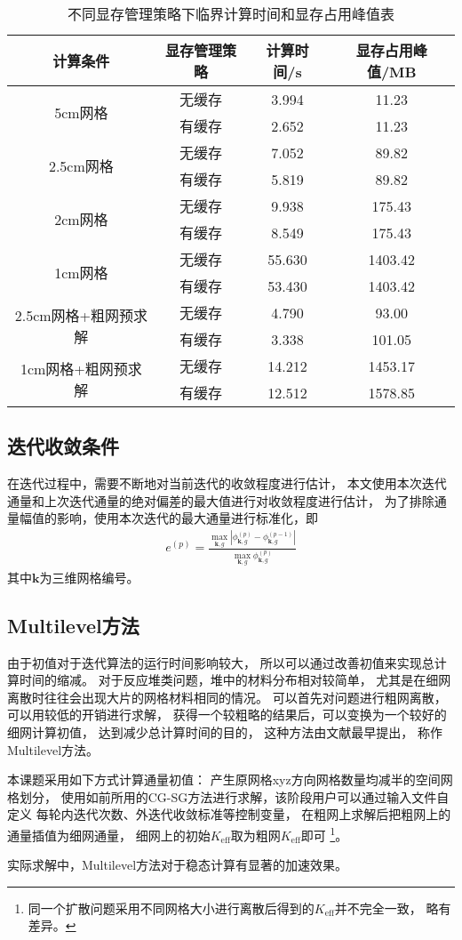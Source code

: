 \begin{table}
\centering
\caption{不同显存管理策略下临界计算时间和显存占用峰值表}
\label{tab:program.cached_alloc}
\begin{tabular}{cccc}
\toprule
计算条件 & 显存管理策略 & 计算时间/s & 显存占用峰值/MB\\
\midrule
\multirow{2}{*}{5cm网格}
 & 无缓存 & 3.994 & 11.23\\
 & 有缓存 & 2.652 & 11.23\\
\multirow{2}{*}{2.5cm网格}
 & 无缓存 & 7.052 & 89.82\\
 & 有缓存 & 5.819 & 89.82\\
\multirow{2}{*}{2cm网格}
 & 无缓存 & 9.938 & 175.43\\
 & 有缓存 & 8.549 & 175.43\\
\multirow{2}{*}{1cm网格}
 & 无缓存 & 55.630 & 1403.42\\
 & 有缓存 & 53.430 & 1403.42\\

\multirow{2}{*}{2.5cm网格+粗网预求解}
 & 无缓存 & 4.790 & 93.00\\
 & 有缓存 & 3.338 & 101.05\\
\multirow{2}{*}{1cm网格+粗网预求解}
 & 无缓存 & 14.212 & 1453.17\\
 & 有缓存 & 12.512 & 1578.85\\
\bottomrule
\end{tabular}
\end{table}

\subsection{迭代收敛条件}

在迭代过程中，需要不断地对当前迭代的收敛程度进行估计，
本文使用本次迭代通量和上次迭代通量的绝对偏差的最大值进行对收敛程度进行估计，
为了排除通量幅值的影响，使用本次迭代的最大通量进行标准化，即
\begin{align}
e^{(p)}=\frac{\displaystyle \max_{\bm{k},g}\left|\phi_{\bm{k},g}^{(p)}-\phi_{\bm{k},g}^{(p-1)}\right|}
         {\displaystyle \max_{\bm{k},g}\phi_{\bm{k},g}^{(p)}}
\end{align}
其中$\bm{k}$为三维网格编号。


\subsection{Multilevel方法}
\label{sec:equsolve.multimesh}

由于初值对于迭代算法的运行时间影响较大，
所以可以通过改善初值来实现总计算时间的缩减。
对于反应堆类问题，堆中的材料分布相对较简单，
尤其是在细网离散时往往会出现大片的网格材料相同的情况。
可以首先对问题进行粗网离散，可以用较低的开销进行求解，
获得一个较粗略的结果后，可以变换为一个较好的细网计算初值，
达到减少总计算时间的目的，
这种方法由文献最早提出，
称作Multilevel方法。

本课题采用如下方式计算通量初值：
产生原网格xyz方向网格数量均减半的空间网格划分，
使用如前所用的CG-SG方法进行求解，该阶段用户可以通过输入文件自定义
每轮内迭代次数、外迭代收敛标准等控制变量，
在粗网上求解后把粗网上的通量插值为细网通量，
细网上的初始$K_\mathrm{eff}$取为粗网$K_\mathrm{eff}$即可%
\footnote{同一个扩散问题采用不同网格大小进行离散后得到的$K_\mathrm{eff}$并不完全一致，
略有差异。}。

实际求解中，Multilevel方法对于稳态计算有显著的加速效果。